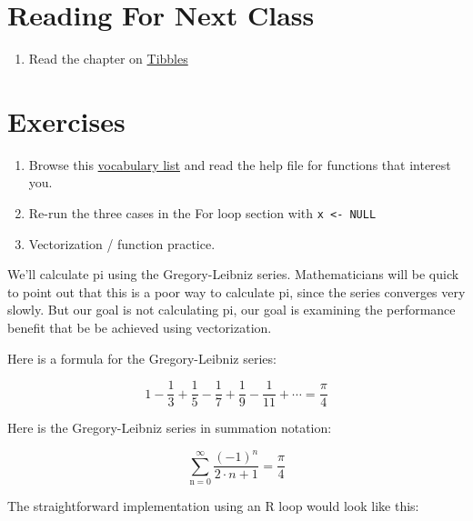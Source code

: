 \documentclass[]{book}
\providecommand{\tightlist}{%
  \setlength{\itemsep}{0pt}\setlength{\parskip}{0pt}}
\theoremstyle{definition}
\theoremstyle{definition}
\theoremstyle{definition}
\theoremstyle{remark}
\begin{document}
\section{Reading For Next Class}\label{reading-for-next-class-1}

\begin{enumerate}
\def\labelenumi{\arabic{enumi}.}
\tightlist
\item
  Read the chapter on \href{http://r4ds.had.co.nz/tibbles.html}{Tibbles}
\end{enumerate}

\section{Exercises}\label{exercises-1}

\begin{enumerate}
\def\labelenumi{\arabic{enumi}.}
\tightlist
\item
  Browse this \href{http://adv-r.had.co.nz/Vocabulary.html}{vocabulary
  list} and read the help file for functions that interest you.
\item
  Re-run the three cases in the For loop section with
  \texttt{x\ \textless{}-\ NULL}
\item
  Vectorization / function practice.
\end{enumerate}

We'll calculate pi using the Gregory-Leibniz series. Mathematicians will
be quick to point out that this is a poor way to calculate pi, since the
series converges very slowly. But our goal is not calculating pi, our
goal is examining the performance benefit that be be achieved using
vectorization.

Here is a formula for the Gregory-Leibniz series:

\begin{equation}
1 - \frac{1}{3} + \frac{1}{5} - \frac{1}{7} + \frac{1}{9} - \frac{1}{11} + \cdots = \frac{\pi}{4}
\end{equation}

Here is the Gregory-Leibniz series in summation notation:

\begin{equation}
\sum_{\text{n}=0}^{\infty} \frac{(-1)^n}{2\cdot n + 1} = \frac{\pi}{4}
\end{equation}

The straightforward implementation using an R loop would look like this:
\end{document}
